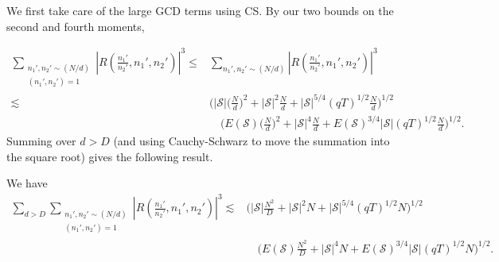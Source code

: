 We first take care of the large GCD terms using CS. By our two bounds on the second and fourth moments,

\begin{align*}
    \sum_{\substack{n_1',n_2'\sim (N/d)\\(n_1',n_2')=1}}  \left|R\left(\frac{n_1'}{n_2'} ,n_1',n_2'\right) \right|^3\leq& 
    \sum_{n_1',n_2' \sim (N/d)}  \left|R\left(\frac{n_1'}{n_2'} ,n_1',n_2' \right)\right|^3 \\
    \lesssim&
    \Bigg(|\mathcal{S}|\Bigg(\frac{N}{d}\Bigg)^2+ |\mathcal{S}|^2\frac{N}{d} + |\mathcal{S}|^{5/4}(qT)^{1/2}\frac{N}{d}\Bigg)^{1/2}\\ &\quad
    \Bigg(E(\mathcal{S})\Bigg(\frac{N}{d}\Bigg)^2+ |\mathcal{S}|^4\frac{N}{d} +  E(\mathcal{S})^{3/4}|\mathcal{S}|(qT)^{1/2}\frac{N}{d}\Bigg)^{1/2}.
\end{align*}
Summing over $d>D$ (and using Cauchy-Schwarz to move the summation into the square root) gives the following result.
\begin{proposition}
    We have \begin{align*}
        \sum_{d> D}\sum_{\substack{n_1',n_2'\sim (N/d)\\(n_1',n_2')=1}}  \left|R\left(\frac{n_1'}{n_2'} ,n_1',n_2'\right) \right|^3 \lesssim & \Bigg(|\mathcal{S}|\frac{N^2}{D}+ |\mathcal{S}|^2N + |\mathcal{S}|^{5/4}(qT)^{1/2}N\Bigg)^{1/2}\\ &\quad
        \Bigg(E(\mathcal{S})\frac{N^2}{D}+ |\mathcal{S}|^4N+  E(\mathcal{S})^{3/4}|\mathcal{S}|(qT)^{1/2}N\Bigg)^{1/2}.
    \end{align*}
\end{proposition}

